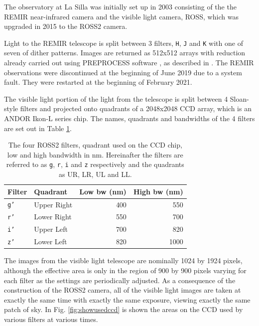 The {\rem} observatory at La Silla was initially set up in 2003
\citep{antonelli05} consisting of the the REMIR near-infrared camera and the
visible light camera, ROSS, which was upgraded in 2015 to the ROSS2 camera.

Light to the REMIR telescope is split between 3 filters, \texttt{H}, \texttt{J}
and \texttt{K} with one of seven of dither patterns. Images are returned as
512x512 arrays with reduction already carried out using PREPROCESS software
\citep{dipaola01}, as described in \citet{calzoletti05}. The REMIR observations
were discontinued at the beginning of June 2019 due to a system fault. They were
restarted at the beginning of February 2021.

The visible light portion of the light from the telescope is split between 4
Sloan-style filters and projected onto quadrants of a 2048x2048 CCD array, which
is an ANDOR Ikon-L series chip. The names, quadrants and bandwidths of the 4
filters are set out in Table \ref{table:ros2quad}.

\begin{table}[!htbp]
\begin{center}
\begin{tabular}{llrr} \hline
Filter & Quadrant & Low bw (nm) & High bw (nm) \\\hline
\texttt{g'} & Upper Right & 400 & 550 \\
\texttt{r'} & Lower Right & 550 & 700 \\
\texttt{i'} & Upper Left & 700 & 820 \\
\texttt{z'} & Lower Left & 820 & 1000 \\
\hline
\end{tabular}
\end{center}
\caption{The four ROSS2 filters, quadrant used on the CCD chip, low and high
bandwidth in nm. Hereinafter the filters are referred to as \texttt{g},
\texttt{r}, \texttt{i} and \texttt{z} respectively and the quadrants as UR, LR,
UL and LL.} \protect\label{table:ros2quad}
\end{table}

The images from the visible light telescope are nominally 1024 by 1924 pixels,
although the effective area is only in the region of 900 by 900
pixels varying for each filter as the settings are periodically adjusted.
As a consequence of the construction of the ROSS2 camera, all of the visible
light images are taken at exactly the same time with exactly the same
exposure, viewing exactly the same patch of sky. In Fig. \ref{fig:showusedccd}
is shown the areas on the CCD used by various filters at various times.

